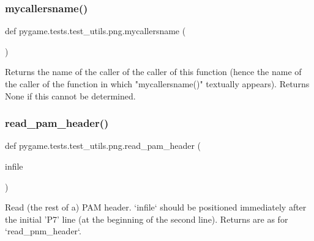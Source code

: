 \subsubsection{\texorpdfstring{mycallersname()}{mycallersname()}}
{\footnotesize\ttfamily def pygame.\+tests.\+test\+\_\+utils.\+png.\+mycallersname (\begin{DoxyParamCaption}{ }\end{DoxyParamCaption})}

\begin{DoxyVerb}Returns the name of the caller of the caller of this function
(hence the name of the caller of the function in which
"mycallersname()" textually appears).  Returns None if this cannot
be determined.\end{DoxyVerb}
 \mbox{\label{namespacepygame_1_1tests_1_1test__utils_1_1png_afaa4429949cbbb618d0878dcef29f436}} 
\subsubsection{\texorpdfstring{read\+\_\+pam\+\_\+header()}{read\_pam\_header()}}
{\footnotesize\ttfamily def pygame.\+tests.\+test\+\_\+utils.\+png.\+read\+\_\+pam\+\_\+header (\begin{DoxyParamCaption}\item[{}]{infile }\end{DoxyParamCaption})}

\begin{DoxyVerb}Read (the rest of a) PAM header.  `infile` should be positioned
immediately after the initial 'P7' line (at the beginning of the
second line).  Returns are as for `read_pnm_header`.
\end{DoxyVerb}
 \mbox{\label{namespacepygame_1_1tests_1_1test__utils_1_1png_ac372143020db06e8a3fb9b1a427f41af}} 

